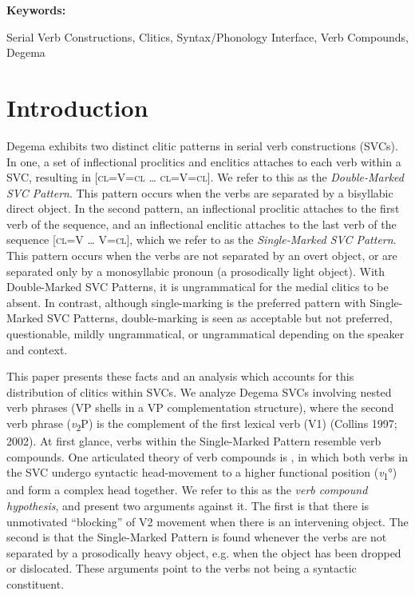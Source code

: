 \begin{styleNoSpacing}\bfseries
Keywords:
\end{styleNoSpacing}

\begin{styleNoSpacing}
Serial Verb Constructions, Clitics, Syntax/Phonology Interface, Verb Compounds, Degema
\end{styleNoSpacing}

\chapter{Introduction}

Degema exhibits two distinct clitic patterns in serial verb constructions (SVCs). In one, a set of inflectional proclitics and enclitics attaches to each verb within a SVC, resulting in [\textsc{cl=}V\textsc{=cl} … \textsc{cl=}V\textsc{=cl}]. We refer to this as the \textit{Double-Marked SVC Pattern}. This pattern occurs when the verbs are separated by a bisyllabic direct object. In the second pattern, an inflectional proclitic attaches to the first verb of the sequence, and an inflectional enclitic attaches to the last verb of the sequence [\textsc{cl=}V … V\textsc{=cl}], which we refer to as the \textit{Single-Marked SVC Pattern}. This pattern occurs when the verbs are not separated by an overt object, or are separated only by a monosyllabic pronoun (a prosodically light object). With Double-Marked SVC Patterns, it is ungrammatical for the medial clitics to be absent. In contrast, although single-marking is the preferred pattern with Single-Marked SVC Patterns, double-marking is seen as acceptable but not preferred, questionable, mildly ungrammatical, or ungrammatical depending on the speaker and context. 

This paper presents these facts and an analysis which accounts for this distribution of clitics within SVCs. We analyze Degema SVCs involving nested verb phrases (VP shells in a VP complementation structure), where the second verb phrase (\textit{v}\textsubscript{2}P) is the complement of the first lexical verb (V1) (Collins 1997; 2002). At first glance, verbs within the Single-Marked Pattern resemble verb compounds. One articulated theory of verb compounds is \citet{Collins2002}, in which both verbs in the SVC undergo syntactic head-movement to a higher functional position (\textit{v}\textsubscript{1}°) and form a complex head together. We refer to this as the \textit{verb compound hypothesis}, and present two arguments against it. The first is that there is unmotivated “blocking” of V2 movement when there is an intervening object. The second is that the Single-Marked Pattern is found whenever the verbs are not separated by a prosodically heavy object, e.g. when the object has been dropped or dislocated. These arguments point to the verbs not being a syntactic constituent. 

